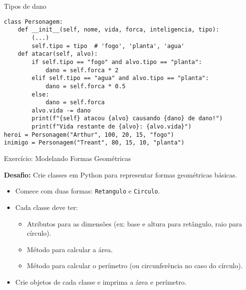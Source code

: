 \begin{frame}[fragile]{Tipos de dano}


    \begin{verbatim}
class Personagem:
    def __init__(self, nome, vida, forca, inteligencia, tipo):
        (...)
        self.tipo = tipo  # 'fogo', 'planta', 'agua'
    def atacar(self, alvo):
        if self.tipo == "fogo" and alvo.tipo == "planta":
            dano = self.forca * 2
        elif self.tipo == "agua" and alvo.tipo == "planta":
            dano = self.forca * 0.5
        else:
            dano = self.forca
        alvo.vida -= dano
        print(f"{self} atacou {alvo} causando {dano} de dano!")
        print(f"Vida restante de {alvo}: {alvo.vida}")
heroi = Personagem("Arthur", 100, 20, 15, "fogo")
inimigo = Personagem("Treant", 80, 15, 10, "planta")
\end{verbatim}



\end{frame}
\begin{frame}{Exercício: Modelando Formas Geométricas}

    \textbf{Desafio:} Crie classes em Python para representar formas geométricas básicas.

    \begin{itemize}
        \item Comece com duas formas: \texttt{Retangulo} e \texttt{Circulo}.
        \item Cada classe deve ter:
              \begin{itemize}
                  \item Atributos para as dimensões (ex: base e altura para retângulo, raio para círculo).
                  \item Método para calcular a área.
                  \item Método para calcular o perímetro (ou circunferência no caso do círculo).
              \end{itemize}
        \item Crie objetos de cada classe e imprima a área e perímetro.
    \end{itemize}


\end{frame}

